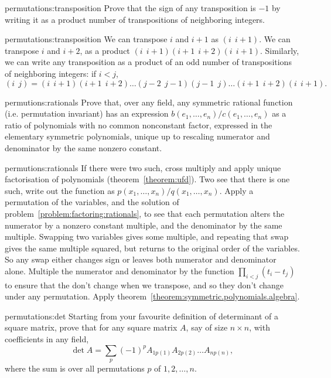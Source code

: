 \begin{problem}{permutations:transposition}
Prove that the sign of any transposition is \(-1\) by writing it as a product number of transpositions of neighboring integers.
\end{problem}
\begin{answer}{permutations:transposition}
We can transpose \(i\) and \(i+1\) as \((i \ \ i+1)\).
We can transpose \(i\) and \(i+2\), as a product \((i \ \ i+1)(i+1 \ \ i+2)(i \ \ i+1)\).
Similarly, we can write any transposition as a product of an odd number of transpositions of neighboring integers: if \(i<j\),
\[
(i \ \ j)=(i \ \ i+1)(i+1 \ \ i+2)\dots(j-2 \ \ j-1)(j-1 \ \ j)\dots(i+1 \ \ i+2)(i \ \ i+1).
\]
\end{answer}
\begin{problem}{permutions:rationals}
Prove that, over any field, any symmetric rational function (i.e. permutation invariant) has an expression \(b(e_1,\dots,e_n)/c(e_1,\dots,e_n)\) as a ratio of polynomials with no common nonconstant factor, expressed in the elementary symmetric polynomials, unique up to rescaling numerator and denominator by the same nonzero constant.
\end{problem}
\begin{answer}{permutions:rationals}
If there were two such, cross multiply and apply unique factorisation of polynomials (theorem~\vref{theorem:ufd}).
Two see that there is one such, write out the function as \(p(x_1,\dots,x_n)/q(x_1,\dots,x_n)\).
Apply a permutation of the variables, and the solution of problem~\vref{problem:factoring:rationals}, to see that each permutation alters the numerator by a nonzero constant multiple, and the denominator by the same multiple.
Swapping two variables gives some multiple, and repeating that swap gives the same multiple squared, but returns to the original order of the variables.
So any swap either changes sign or leaves both numerator and denominator alone.
Multiple the numerator and denominator by the function \(\prod_{i<j}(t_i - t_j)\) to ensure that the don't change when we transpose, and so they don't change under any permutation.
Apply theorem~\vref{theorem:symmetric.polynomials.algebra}.
\end{answer}
\begin{problem}{permutations:det}
Starting from your favourite definition of determinant of a square matrix, prove that for any square matrix \(A\), say of size \(n \times n\), with coefficients in any field,
\[
\det A = \sum_p (-1)^p A_{1p(1)}A_{2p(2)} \dots A_{np(n)},
\]
where the sum is over all permutations \(p\) of \(1,2,\dots,n\).
\end{problem}
